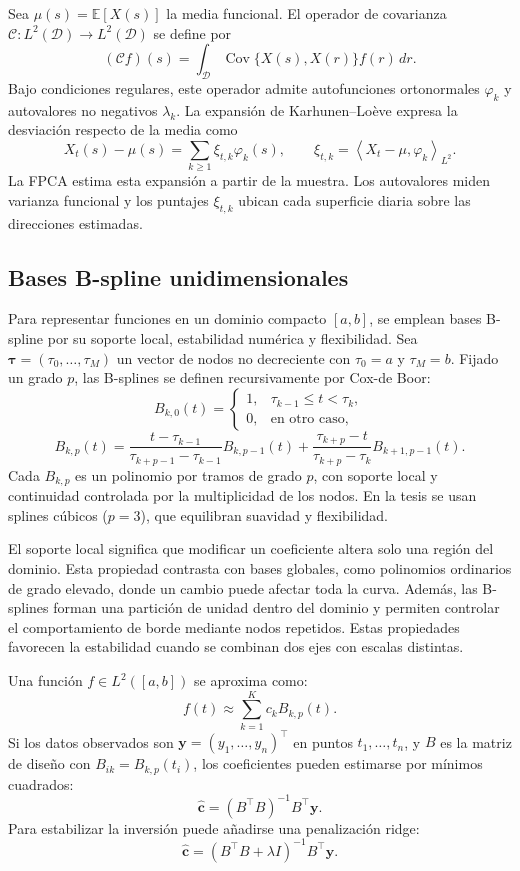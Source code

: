 \documentclass[a4paper,11pt]{article}
\newcommand{\E}{\mathbb{E}}
\newcommand{\inner}[2]{\left\langle #1,#2 \right\rangle}
\begin{document}
Sea \(\mu(s)=\E[X(s)]\) la media funcional. El operador de covarianza \(\mathcal{C}:L^2(\mathcal D)\to L^2(\mathcal D)\) se define por
\[
  (\mathcal C f)(s)
  =
  \int_{\mathcal D}
  \operatorname{Cov}\{X(s),X(r)\}f(r)\,dr.
\]
Bajo condiciones regulares, este operador admite autofunciones ortonormales \(\varphi_k\) y autovalores no negativos \(\lambda_k\). La expansión de Karhunen--Loève expresa la desviación respecto de la media como
\[
  X_t(s)-\mu(s)=\sum_{k\geq 1}\xi_{t,k}\varphi_k(s),
  \qquad
  \xi_{t,k}=\inner{X_t-\mu}{\varphi_k}_{L^2}.
\]
La FPCA estima esta expansión a partir de la muestra. Los autovalores miden varianza funcional y los puntajes \(\xi_{t,k}\) ubican cada superficie diaria sobre las direcciones estimadas.

\subsection{Bases B-spline unidimensionales}

Para representar funciones en un dominio compacto \([a,b]\), se emplean bases B-spline por su soporte local, estabilidad numérica y flexibilidad. Sea \(\boldsymbol{\tau}=(\tau_0,\ldots,\tau_M)\) un vector de nodos no decreciente con \(\tau_0=a\) y \(\tau_M=b\). Fijado un grado \(p\), las B-splines se definen recursivamente por Cox-de Boor:
\[
B_{k,0}(t)=
\begin{cases}
1, & \tau_{k-1}\leq t<\tau_k,\\
0, & \text{en otro caso},
\end{cases}
\]
\[
B_{k,p}(t)=
\frac{t-\tau_{k-1}}{\tau_{k+p-1}-\tau_{k-1}}B_{k,p-1}(t)
+
\frac{\tau_{k+p}-t}{\tau_{k+p}-\tau_k}B_{k+1,p-1}(t).
\]
Cada \(B_{k,p}\) es un polinomio por tramos de grado \(p\), con soporte local y continuidad controlada por la multiplicidad de los nodos. En la tesis se usan splines cúbicos (\(p=3\)), que equilibran suavidad y flexibilidad.

El soporte local significa que modificar un coeficiente altera solo una región del dominio. Esta propiedad contrasta con bases globales, como polinomios ordinarios de grado elevado, donde un cambio puede afectar toda la curva. Además, las B-splines forman una partición de unidad dentro del dominio y permiten controlar el comportamiento de borde mediante nodos repetidos. Estas propiedades favorecen la estabilidad cuando se combinan dos ejes con escalas distintas.

Una función \(f\in L^2([a,b])\) se aproxima como:
\[
  f(t)\approx \sum_{k=1}^{K} c_k B_{k,p}(t).
\]
Si los datos observados son \(\mathbf{y}=(y_1,\ldots,y_n)^\top\) en puntos \(t_1,\ldots,t_n\), y \(B\) es la matriz de diseño con \(B_{ik}=B_{k,p}(t_i)\), los coeficientes pueden estimarse por mínimos cuadrados:
\[
  \widehat{\mathbf{c}}=(B^\top B)^{-1}B^\top \mathbf{y}.
\]
Para estabilizar la inversión puede añadirse una penalización ridge:
\[
  \widehat{\mathbf{c}}=(B^\top B+\lambda I)^{-1}B^\top \mathbf{y}.
\]
\end{document}
